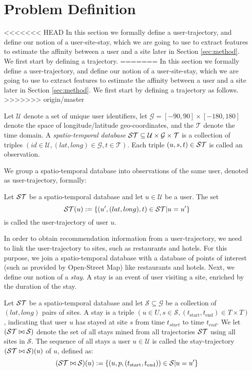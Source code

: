 \section{Problem Definition} 
\label{sec:probdef}
<<<<<<< HEAD
In this section we formally define a user-trajectory, and define our notion of a user-site-stay, which we are going 
to use to extract features to estimate the affinity between a user and a site later in Section \ref{sec:method}. 
We first start by defining a trajectory.
=======
In this section we formally define a user-trajectory, and define our notion of a user-site-stay, which we are going
to use to extract features to estimate the affinity between a user and a site later in Section \ref{sec:method}.
We first start by defining a trajectory as follows.
>>>>>>> origin/master
\begin{definition}
Let $\mathcal{U}$ denote a set of unique user identifiers, let $\mathcal{G}=[-90,90]\times [-180,180]$ denote the space of longitude/latitude geo-coordinates, and the $\mathcal{T}$ denote the time domain.
A \emph{spatio-temporal database} $\mathcal{ST}\subseteq \mathcal{U}\times \mathcal{G}\times \mathcal{T}$ is a collection of triples $(id\in\mathcal{U},(lat,long)\in\mathcal{G},t\in\mathcal{T})$. Each triple $(u,s,t)\in\mathcal{ST}$ is called an observation.
\end{definition}
We group a spatio-temporal database into observations of the same user, denoted as user-trajectory, formally:
\begin{definition}
Let $\mathcal{ST}$ be a spatio-temporal database and let $u\in\mathcal{U}$ be a user. The set
$$
\mathcal{ST}(u):=\{(u^\prime,(lat,long),t)\in\mathcal{ST}|u=u^\prime\}
$$
is called the user-trajectory of user $u$.
\end{definition}
In order to obtain recommendation information from a user-trajectory, we need to link the user-trajectory to sites, such as restaurants and hotels. For this purpose, we join a spatio-temporal database with a database of points of interest (such as provided by Open-Street Map) like restaurants and hotels. Next, we define our notion of a \emph{stay}. A stay is an event of user visiting a site, enriched by the duration of the stay.
\begin{definition}
Let $\mathcal{ST}$ be a spatio-temporal database and let $\mathcal{S}\subseteq \mathcal{G}$ be a collection of $(lat,long)$ pairs of sites. A stay is a triple $(u\in U,s\in\mathcal{S},(t_\text{start},t_\text{end})\in T\times T)$, indicating that user $u$ has stayed at site $s$ from time $t_{start}$ to time $t_{end}$.
We let $(\mathcal{ST}\bowtie\mathcal{S})$ denote the set of all stays mined from all trajectories $\mathcal{ST}$ using all sites in $\mathcal{S}$.
The sequence of all stays a user $u\in\mathcal{U}$ is called the stay-trajectory $(\mathcal{ST}\bowtie\mathcal{S})(u)$ of $u$, defined as:
$$
(\mathcal{ST}\bowtie\mathcal{S})(u):=\{(u,p,(t_\text{start},t_\text{end}))\in\mathcal{S}|u=u^\prime\}
$$
\end{definition}
